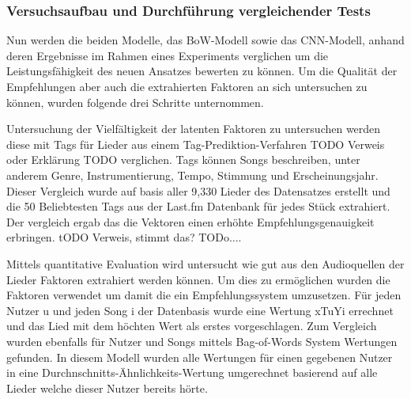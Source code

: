 \documentclass[twosided,a4,10pt]{article}
\begin{document}
\begin{multicols}{2}
		\subsubsection{Versuchsaufbau und Durchführung vergleichender Tests}
		
		Nun werden die beiden Modelle, das BoW-Modell sowie das CNN-Modell, anhand deren Ergebnisse im Rahmen eines Experiments verglichen um die Leistungsfähigkeit des neuen Ansatzes bewerten zu können. Um die Qualität der Empfehlungen aber auch die extrahierten Faktoren an sich untersuchen zu können, wurden folgende drei Schritte unternommen.
		
		
		Untersuchung der Vielfältigkeit der latenten Faktoren zu untersuchen werden diese mit Tags für Lieder aus einem Tag-Prediktion-Verfahren TODO Verweis oder Erklärung TODO verglichen. Tags können Songs beschreiben, unter anderem Genre, Instrumentierung, Tempo, Stimmung und Erscheinungsjahr. Dieser Vergleich wurde auf basis aller 9,330 Lieder des Datensatzes erstellt  und die 50 Beliebtesten Tags aus der Last.fm Datenbank für jedes Stück extrahiert. Der vergleich ergab das die Vektoren einen erhöhte Empfehlungsgenauigkeit erbringen. tODO Verweis, stimmt das? TODo....
		
		
		
		Mittels quantitative Evaluation wird untersucht wie gut aus den Audioquellen der Lieder Faktoren extrahiert werden können. Um dies zu ermöglichen wurden die Faktoren verwendet um damit die ein Empfehlungssystem umzusetzen. Für jeden Nutzer u und jeden Song i der Datenbasis wurde eine Wertung xTuYi errechnet und das Lied mit dem höchten Wert als erstes vorgeschlagen. Zum Vergleich wurden ebenfalls für Nutzer und Songs mittels Bag-of-Words System Wertungen gefunden. In diesem Modell wurden alle Wertungen für einen gegebenen Nutzer in eine Durchnschnitts-Ähnlichkeits-Wertung umgerechnet basierend auf alle Lieder welche dieser Nutzer bereits hörte.
		

\end{multicols}
\end{document}
